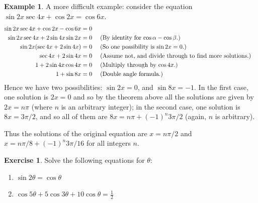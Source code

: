 \documentclass[a4paper,leqno]{article}
\numberwithin{equation}{section}
\theoremstyle{definition}
\newtheorem{ex}[equation]{Example}
\newtheorem{exercise}[equation]{Exercise}
\theoremstyle{remark}
\begin{document}
\begin{ex}
  A more difficult example: consider the equation $ \sin 2x \sec 4x + \cos 2x = \cos 6x $.
  \begin{align*}
    \sin 2x \sec 4x + \cos 2x - \cos 6x &= 0\\
    \sin 2x \sec 4x + 2\sin 4x \sin 2x &= 0 && \text{ (By identity for $ \cos \alpha - \cos \beta $.)}\\
    \sin 2x (\sec 4x + 2\sin 4x) &= 0 && \text{ (So one possibility is $ \sin 2x = 0 $.)}\\
    \sec 4x + 2\sin 4x &= 0 && \text{ (Assume not, and divide through to find more solutions.)}\\
    1 + 2\sin 4x \cos 4x &= 0 && \text{ (Multiply through by $ \cos 4x $.)}\\
    1 + \sin 8x &= 0 && \text{ (Double angle formula.)}
  \end{align*}
  Hence we have two possibilities: $ \sin 2x = 0 $, and $ \sin 8x = -1 $. In the first case, one solution is $ 2x = 0 $
  and so by the theorem above all the solutions are given by $ 2x = n\pi $ (where $ n $ is an arbitrary integer); in the
  second case, one solution is $ 8x = 3\pi/2 $, and so all of them are $ 8x = n\pi + (-1)^n 3\pi/2 $ (again, $ n $ is arbitrary).

  Thus the solutions of the original equation are $ x = n\pi/2 $ and $ x = n\pi/8 + (-1)^n 3\pi/16 $ for all integers $ n $.
\end{ex}

\begin{exercise}
  Solve the following equations for $ \theta $:
  \begin{enumerate}
    \item $ \sin 2\theta = \cos \theta $
    \item $ \cos 5\theta + 5\cos 3\theta + 10\cos \theta = \frac{1}{2} $
  \end{enumerate}
\end{exercise}
\end{document}
